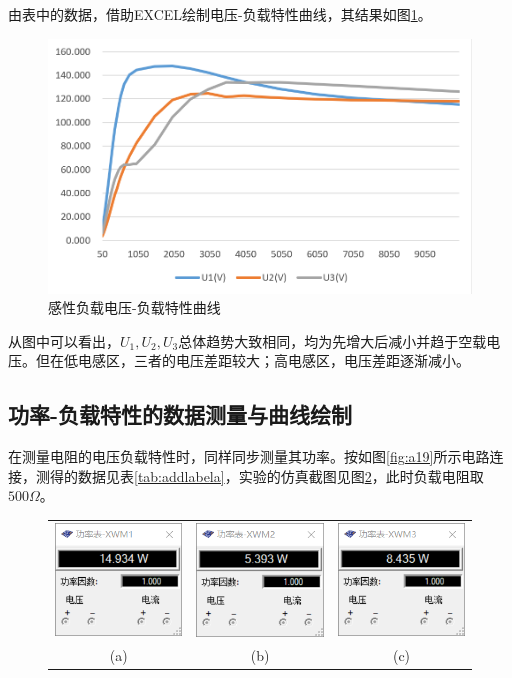 \documentclass[12pt]{article}%
\begin{document}
由表中的数据，借助EXCEL绘制电压-负载特性曲线，其结果如图\ref{fig:a121xq}。\par
\begin{figure}[htbp]
\centering\includegraphics[width=0.8\linewidth]{TIM20180601015006.png}
\caption{\heiti{}感性负载电压-负载特性曲线}\label{fig:a121xq}
\end{figure}
从图中可以看出，$U_1,U_2,U_3$总体趋势大致相同，均为先增大后减小并趋于空载电压。但在低电感区，三者的电压差距较大；高电感区，电压差距逐渐减小。
\subsection{功率-负载特性的数据测量与曲线绘制}
在测量电阻的电压负载特性时，同样同步测量其功率。按如图\ref{fig:a19}所示电路连接，测得的数据见表\ref{tab:addlabela}，实验的仿真截图见图\ref{fig:x11a8xx}，此时负载电阻取$500\Omega$。
\begin{figure}[htbp]
\centering
\begin{tabular}{ccc}
\includegraphics[width=0.3\linewidth]{TIM20180607130156.png}&
\includegraphics[width=0.3\linewidth]{TIM20180607130226.png}&
\includegraphics[width=0.3\linewidth]{TIM20180607130252.png}\\
(a)&(b)&(c)\\
\end{tabular}
\caption{\heiti{}}\label{fig:x11a8xx}
\end{figure}
\end{document}
